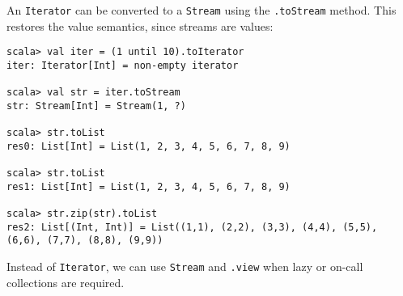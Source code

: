 An \lstinline!Iterator! can be converted to a \lstinline!Stream!
using the \lstinline!.toStream! method. This restores the value semantics,
since streams are values:
\begin{lstlisting}
scala> val iter = (1 until 10).toIterator
iter: Iterator[Int] = non-empty iterator

scala> val str = iter.toStream
str: Stream[Int] = Stream(1, ?)

scala> str.toList
res0: List[Int] = List(1, 2, 3, 4, 5, 6, 7, 8, 9)

scala> str.toList
res1: List[Int] = List(1, 2, 3, 4, 5, 6, 7, 8, 9)

scala> str.zip(str).toList
res2: List[(Int, Int)] = List((1,1), (2,2), (3,3), (4,4), (5,5), (6,6), (7,7), (8,8), (9,9)) 
\end{lstlisting}
Instead of \lstinline!Iterator!, we can use \lstinline!Stream! and
\lstinline!.view! when lazy or on-call collections are required. 
